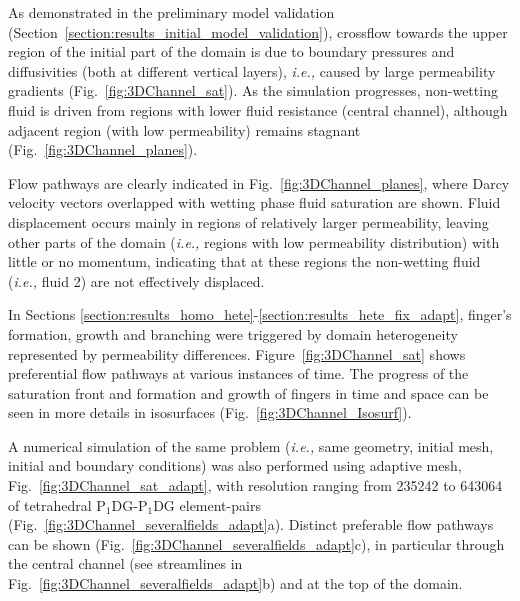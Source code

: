 \documentclass[preprint,authoryear,12pt]{elsarticle}
\newcommand{\PNDG}[2][error]{P$_{#1}$DG-P$_{#2}$DG}
\newcommand{\ie}{{\it i.e., }}
\begin{document}
As demonstrated in the preliminary model validation (Section~\ref{section:results_initial_model_validation}), crossflow towards the upper region of the initial part of the domain is due to boundary pressures and diffusivities (both at different vertical layers), \ie caused by large permeability gradients (Fig.~\ref{fig:3DChannel_sat}). As the simulation progresses, non-wetting fluid is driven from regions with lower fluid resistance (central channel), although adjacent region (with low permeability) remains stagnant (Fig.~\ref{fig:3DChannel_planes}).


\medskip
Flow pathways are clearly indicated in Fig.~\ref{fig:3DChannel_planes}, where Darcy velocity vectors overlapped with wetting phase fluid saturation are shown. Fluid displacement occurs mainly in regions of relatively larger permeability, leaving other parts of the domain (\ie regions with low permeability distribution) with little or no momentum, indicating that at these regions the non-wetting fluid (\ie fluid 2) are not effectively displaced. 
   
\medskip
In Sections \ref{section:results_homo_hete}-\ref{section:results_hete_fix_adapt}, finger's formation, growth and branching were triggered by domain heterogeneity represented by permeability differences. Figure~\ref{fig:3DChannel_sat} shows preferential flow pathways at various instances of time. The progress of the saturation front and formation and growth of fingers in time and space can be seen in more details in isosurfaces (Fig.~\ref{fig:3DChannel_Isosurf}).

\medskip
A numerical simulation of the same problem (\ie same geometry, initial mesh, initial and boundary conditions) was also performed using adaptive mesh, Fig.~\ref{fig:3DChannel_sat_adapt}, with resolution ranging from 235242 to 643064 of tetrahedral \PNDG[1]{1} element-pairs (Fig.~\ref{fig:3DChannel_severalfields_adapt}a). Distinct preferable flow pathways can be shown (Fig.~\ref{fig:3DChannel_severalfields_adapt}c), in particular through the central channel (see streamlines in Fig.~\ref{fig:3DChannel_severalfields_adapt}b) and at the top of the domain.
\end{document}
